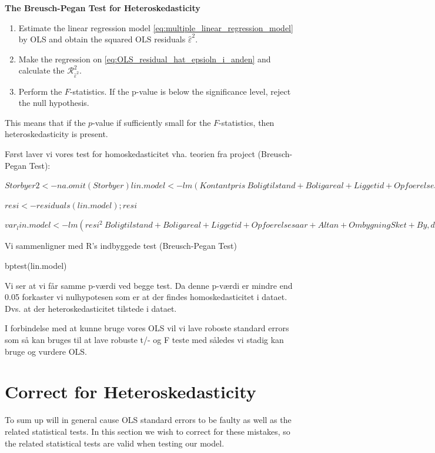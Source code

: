 \textbf{The Breusch-Pegan Test for Heteroskedasticity}
\begin{enumerate}[label=(\roman*)]
    \item Estimate the linear regression model \eqref{eq:multiple_linear_regression_model} by OLS and obtain the squared OLS residuals $\hat{\varepsilon}^2$. 
    \item Make the regression on \eqref{eq:OLS_residual_hat_epsioln_i_anden} and calculate the $\mathcal{R}^2_{\hat{\varepsilon}^2}$. 
    \item Perform the $F$-statistics. If the p-value is below the significance level, reject the null hypothesis. 
\end{enumerate}

This means that if the $p$-value if sufficiently small for the $F$-statistics, then heteroskedasticity is present. 

\begin{example}

Først laver vi vores test for homoskedasticitet vha. teorien fra project (Breusch-Pegan Test): 


$Storbyer2 <- na.omit(Storbyer)
lin.model <- lm(Kontantpris ~ Boligtilstand + Boligareal + Liggetid + Opfoerelsesaar + Altan + OmbygningSket + By, data = Storbyer2); lin.model
summary(lin.model)$

$resi <- residuals(lin.model); resi$


$var_lin.model <- lm(resi^2 ~ Boligtilstand + Boligareal + Liggetid + Opfoerelsesaar + Altan + OmbygningSket + By, data = Storbyer2); var_lin.model
summary(var_lin.model)$


Vi sammenligner med R's indbyggede test (Breusch-Pegan Test)

bptest(lin.model)


Vi ser at vi får samme p-værdi ved begge test. Da denne p-værdi er mindre end 0.05 forkaster vi nulhypotesen som er at der findes homoskedasticitet i dataet. Dvs. at der heteroskedasticitet tilstede i dataet. 

I forbindelse med at kunne bruge vores OLS vil vi lave roboste standard errors som så kan bruges til at lave robuste t/- og F teste med således vi stadig kan bruge og vurdere OLS. 

\end{example}

\section{Correct for Heteroskedasticity}
To sum up \hetero will in general cause OLS standard errors to be faulty as well as the related statistical tests. In this section we wish to correct for these mistakes, so the related statistical tests are valid when testing our model. 


